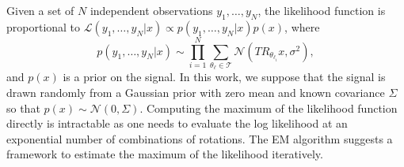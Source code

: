 \documentclass[english,12pt]{article}
\numberwithin{equation}{section}
\numberwithin{thm}{section} %
\begin{document}
Given a set of $N$ independent observations $y_1,\ldots,y_N$, the likelihood function  is proportional to $\mathcal{L}(y_1,\ldots,y_N|x) \propto	 p(y_1,\ldots,y_N|x)p(x)$, where  
\begin{equation} \label{eq:likelihood}
p(y_1,\ldots,y_N|x)\sim \prod_{i=1}^N\sum_{{\theta_\ell}\in\mathcal{T}}\mathcal{N}(T R_{\theta_{\ell_i}}x,\sigma^2),
\end{equation}
and $p(x)$ is a prior on the signal. 
In this work, we suppose that the signal is drawn randomly from a Gaussian prior with zero mean and known covariance $\Sigma$ so that $p(x)\sim\mathcal{N}(0,\Sigma)$. 
Computing the maximum of the likelihood function directly is intractable
as one needs to evaluate the log likelihood at  an exponential number of combinations of rotations. The EM algorithm suggests a framework to  estimate the maximum of the likelihood iteratively. 
\end{document}
